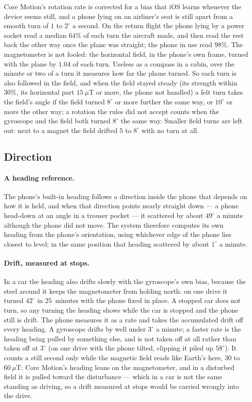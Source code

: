 \documentclass[11pt]{article}
\newcommand{\dg}{^\circ}
\begin{document}
Core Motion's rotation rate is corrected for a bias that iOS learns whenever the device seems still, and
a phone lying on an airliner's seat is still apart from a smooth turn of $1$ to $2\dg$ a second. On the return
flight the phone lying by a power socket read a median $64\%$ of each turn the aircraft made, and then read
the rest back the other way once the plane was straight; the phone in use read $98\%$. The magnetometer is not
fooled: the horizontal field, in the phone's own frame, turned with the plane by $1.04$ of each turn. Useless
as a compass in a cabin, over the minute or two of a turn it measures how far the phone turned. So each turn
is also followed in the field, and when the field stayed steady (its strength within $30\%$, its horizontal
part $15~\mu$T or more, the phone not handled) a felt turn takes the field's angle if the field turned $8\dg$
or more further the same way, or $10\dg$ or more the other way; a rotation the rules did not accept counts
when the gyroscope and the field both turned $8\dg$ the same way. Smaller field turns are left out: next to a
magnet the field drifted $5$ to $8\dg$ with no turn at all.

\subsection{Direction}\label{sec:direction}

\paragraph{A heading reference.} The phone's built-in heading follows a direction inside the phone
that depends on how it is held, and when that direction points nearly straight down --- a phone
head-down at an angle in a trouser pocket --- it scattered by about $49\dg$ a minute although the
phone did not move. The system therefore computes its own heading from the phone's orientation,
using whichever edge of the phone lies closest to level; in the same position that heading scattered
by about $1\dg$ a minute.

\paragraph{Drift, measured at stops.} In a car the heading also drifts slowly with the gyroscope's own
bias, because the steel around it keeps the magnetometer from holding north: on one drive it turned
$42\dg$ in $25$~minutes with the phone fixed in place. A stopped car does not turn, so any turning the
heading shows while the car is stopped and the phone still is drift. The phone measures it as a rate
and takes the accumulated drift off every heading. A gyroscope drifts by well under $3\dg$ a minute; a
faster rate is the heading being pulled by something else, and is not taken off at all rather than taken
off at $3\dg$ (on one drive with the phone tilted, clipping it piled up $58\dg$). It counts a still second only
while the magnetic field reads like Earth's here, $30$ to $60~\mu$T: Core Motion's heading leans on the
magnetometer, and in a disturbed field it is pulled toward the disturbance --- which in a car is not the
same standing as driving, so a drift measured at stops would be carried wrongly into the drive.
\end{document}
